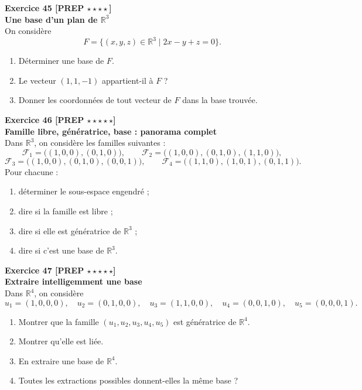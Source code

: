 \documentclass[11pt,a4paper]{article}
\begin{document}
\textbf{Exercice 45 [PREP $\star\star\star\star$]}\\
\textbf{Une base d’un plan de \(\mathbb{R}^3\)}\\
On considère
\[
F=\{(x,y,z)\in\mathbb{R}^3\mid 2x-y+z=0\}.
\]
\begin{enumerate}[label=\alph*)]
    \item Déterminer une base de \(F\).
    \item Le vecteur \((1,1,-1)\) appartient-il à \(F\) ?
    \item Donner les coordonnées de tout vecteur de \(F\) dans la base trouvée.
\end{enumerate}

\textbf{Exercice 46 [PREP $\star\star\star\star\star$]}\\
\textbf{Famille libre, génératrice, base : panorama complet}\\
Dans \(\mathbb{R}^3\), on considère les familles suivantes :
\[
\mathcal F_1=\big((1,0,0),(0,1,0)\big),\qquad
\mathcal F_2=\big((1,0,0),(0,1,0),(1,1,0)\big),
\]
\[
\mathcal F_3=\big((1,0,0),(0,1,0),(0,0,1)\big),\qquad
\mathcal F_4=\big((1,1,0),(1,0,1),(0,1,1)\big).
\]
Pour chacune :
\begin{enumerate}[label=\alph*)]
    \item déterminer le sous-espace engendré ;
    \item dire si la famille est libre ;
    \item dire si elle est génératrice de \(\mathbb{R}^3\) ;
    \item dire si c’est une base de \(\mathbb{R}^3\).
\end{enumerate}

\textbf{Exercice 47 [PREP $\star\star\star\star\star$]}\\
\textbf{Extraire intelligemment une base}\\
Dans \(\mathbb{R}^4\), on considère
\[
u_1=(1,0,0,0),\quad
u_2=(0,1,0,0),\quad
u_3=(1,1,0,0),\quad
u_4=(0,0,1,0),\quad
u_5=(0,0,0,1).
\]
\begin{enumerate}[label=\alph*)]
    \item Montrer que la famille \((u_1,u_2,u_3,u_4,u_5)\) est génératrice de \(\mathbb{R}^4\).
    \item Montrer qu’elle est liée.
    \item En extraire une base de \(\mathbb{R}^4\).
    \item Toutes les extractions possibles donnent-elles la même base ?
\end{enumerate}
\end{document}
